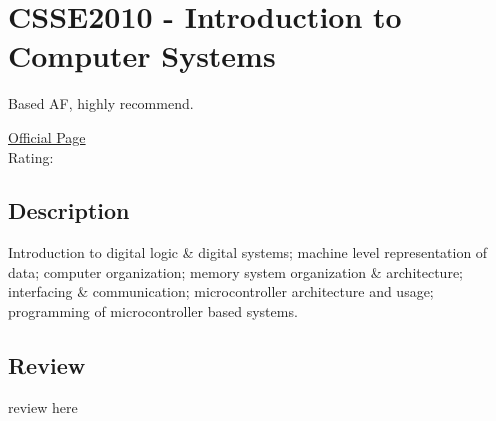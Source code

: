 \hypertarget{CSSE2010}{\section{CSSE2010 - Introduction to Computer Systems}}
Based AF, highly recommend.

\large
\textcolor{turbo_purple}{\href{https://my.uq.edu.au/programs-courses/course.html?course_code=CSSE2010}{Official Page}} \\
Rating: \cstar\cstar\cstar\cstar\ostar

\normalsize
\subsection*{Description}
Introduction to digital logic \& digital systems; machine level representation of data; computer organization; memory system organization \& architecture; interfacing \& communication; microcontroller architecture and usage; programming of microcontroller based systems.

\subsection*{Review}
review here

